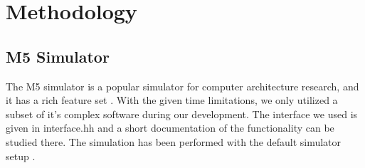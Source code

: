 \section{Methodology}

\subsection{M5 Simulator}

The M5 simulator is a popular simulator for computer architecture research, and
it has a rich feature set \cite{user_doc}. With the given time limitations, we only utilized a
subset of it’s complex software during our development. The interface we used is
given in interface.hh and a short documentation of the functionality can be
studied there. The simulation has been performed with the default simulator
setup .


